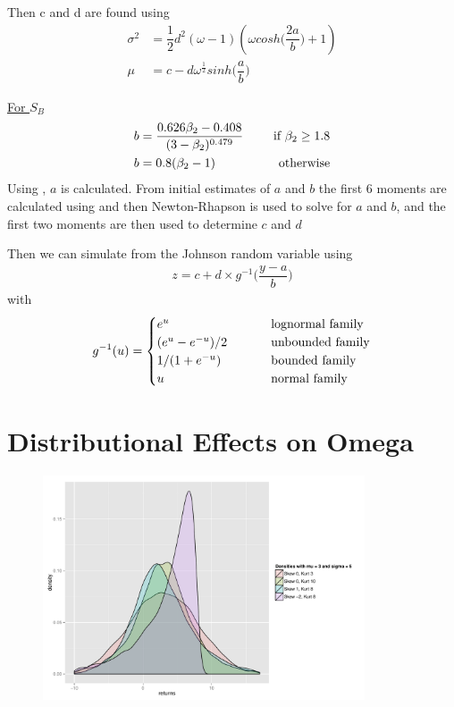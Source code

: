 \documentclass{beamer}
\begin{document}
\begin{frame}
Then c and d are found using
\begin{align}
\sigma^2 &= \dfrac{1}{2}d^2(\omega - 1)(\omega cosh\Big(\dfrac{2a}{b}\Big) + 1) \nonumber \\
\mu 	 &= c - d\omega^{\frac{1}{2}}sinh\Big(\dfrac{a}{b}\Big) \nonumber
\end{align}

\underline{For $S_B$}
\vspace*{3mm}
\begin{align}
b &= \dfrac{0.626\beta_2 - 0.408}{(3 - \beta_2)^{0.479}} \hspace*{5mm} &\text{if } \beta_2 \geq 1.8 \nonumber \\
b &= 0.8(\beta_2 - 1) &\text{otherwise} \nonumber
\end{align}
Using \citet{draper1951}, $a$ is calculated. From initial estimates of $a$ and $b$ the first 6 moments are calculated using \citet{draper1952} and then Newton-Rhapson is used to solve for $a$ and $b$, and the first two moments are then used to determine $c$ and $d$

\end{frame}

\begin{frame}
Then we can simulate from the Johnson random variable using
\begin{align}
z = c + d \times g^{-1}\Big(\dfrac{y - a}{b}\Big)
\end{align}
with
\begin{align}
g^{-1}(u) = 
\begin{cases}
e^u \hspace{25mm} &\text{lognormal family}\\
(e^u - e^{-u})/2 &\text{unbounded family}\\
1/(1 + e^{-u}) &\text{bounded family}\\
u &\text{normal family}
\end{cases}
\end{align}
\end{frame}

\section{Distributional Effects on Omega}

\begin{frame}
\begin{figure}
\includegraphics[width=3.75in]{plots/Densities.pdf}
\end{figure}
\end{frame}
\end{document}
